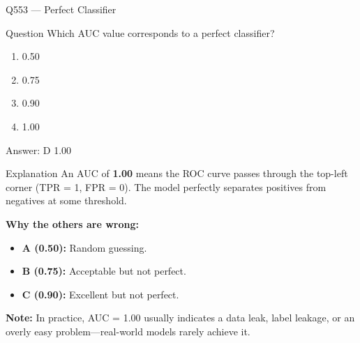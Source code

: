 \documentclass[aspectratio=169,8pt]{beamer}
\begin{document}
	\begin{frame}{Q553 --- Perfect Classifier}
		\begin{block}{Question}
			Which AUC value corresponds to a perfect classifier?
			\begin{enumerate}
				\item 0.50
				\item 0.75
				\item 0.90
				\item 1.00
			\end{enumerate}
		\end{block}
		
		\begin{exampleblock}{Answer: D}
			1.00
		\end{exampleblock}
		
		\begin{block}{Explanation}
			An AUC of \textbf{1.00} means the ROC curve passes through the top-left corner
			(TPR = 1, FPR = 0). The model perfectly separates positives from negatives at
			some threshold.
			
			\textbf{Why the others are wrong:}
			\begin{itemize}
				\item \textbf{A (0.50):} Random guessing.
				\item \textbf{B (0.75):} Acceptable but not perfect.
				\item \textbf{C (0.90):} Excellent but not perfect.
			\end{itemize}
			
			\textbf{Note:} In practice, AUC = 1.00 usually indicates a data leak, label
			leakage, or an overly easy problem---real-world models rarely achieve it.
		\end{block}
	\end{frame}
	
\end{document}
